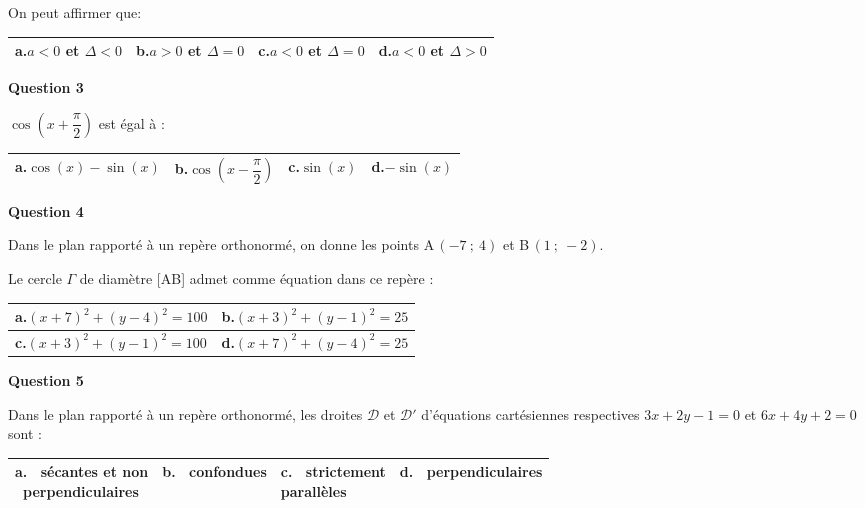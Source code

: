 On peut affirmer que:

\medskip

{\renewcommand{\arraystretch}{1.5}
\begin{tabularx}{\linewidth}{|X|X|X|X|}
\hline
\textbf{a.}\quad $a<0$ et $\Delta<0$
& \textbf{b.}\quad $a>0$ et $\Delta=0$ 
& \textbf{c.}\quad $a<0$ et $\Delta=0$
& \textbf{d.}\quad $a<0$ et $\Delta>0$\\
\hline
\end{tabularx}}

\bigskip

\textbf{Question 3}

\medskip

$\cos \left (x+\dfrac{\pi}{2}\right)$ est égal à :

\medskip

{%
\begin{tabularx}{\linewidth}{|X|X|X|X|}
\hline
\textbf{a.}\quad $\cos(x)-\sin(x)$
& \textbf{b.}\quad $\cos \left (x-\dfrac{\pi}{2}\right )$\rule[-10pt]{0pt}{25pt}
& \textbf{c.}\quad $\sin(x)$
& \textbf{d.}\quad $-\sin(x)$\\
\hline
\end{tabularx}}



\textbf{Question 4}

\medskip

Dans le plan rapporté à un repère orthonormé, on donne les points A\,$(-7~;~4)$ et B\,$(1~;~-2)$.

Le cercle $\Gamma$ de diamètre [AB] admet comme équation dans ce repère :

\medskip

{\renewcommand{\arraystretch}{1.5}
\begin{tabularx}{\linewidth}{|X|X|}
\hline
\textbf{a.}\quad $(x+7)^2+(y-4)^2=100$
& \textbf{b.}\quad $(x+3)^2+(y-1)^2=25$\\
\hline
 \textbf{c.}\quad $(x+3)^2+(y-1)^2=100$
& \textbf{d.}\quad $(x+7)^2+(y-4)^2=25$\\
\hline
\end{tabularx}}

\bigskip

\textbf{Question 5}

\medskip

Dans le plan rapporté à un repère orthonormé, les droites $\mathcal{D}$ et $\mathcal{D}'$ d'équations cartésiennes respectives $3x+2y-1=0$  et $6x+4y+2=0$ sont :

\medskip

{\renewcommand{\arraystretch}{3}
\begin{tabularx}{\linewidth}{|X|X|X|X|}
\hline
\shortstack{\textbf{a.}~ sécantes et non\\~perpendiculaires}
& \shortstack{\textbf{b.}~ confondues\\\phantom{confondues}}
& \shortstack{\textbf{c.}~ strictement\\parallèles}
& \shortstack{\textbf{d.}~ perpendiculaires\\\phantom{confondues}}\\
\hline
\end{tabularx}}

\vspace{0.5cm}

